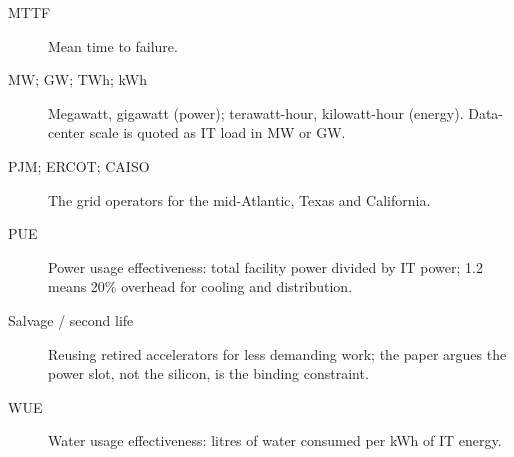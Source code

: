 \documentclass[11pt,letterpaper]{article}
\begin{document}
\begin{description}
\item[MTTF] Mean time to failure.
\item[MW; GW; TWh; kWh] Megawatt, gigawatt (power); terawatt-hour, kilowatt-hour (energy). Data-center scale is quoted as IT load in MW or GW.
\item[PJM; ERCOT; CAISO] The grid operators for the mid-Atlantic, Texas and California.
\item[PUE] Power usage effectiveness: total facility power divided by IT power; 1.2 means 20\% overhead for cooling and distribution.
\item[Salvage / second life] Reusing retired accelerators for less demanding work; the paper argues the power slot, not the silicon, is the binding constraint.
\item[WUE] Water usage effectiveness: litres of water consumed per kWh of IT energy.
\end{description}
\end{document}
